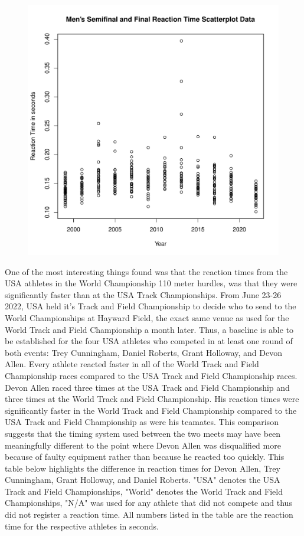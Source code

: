 \documentclass[12pt, letterpaper, titlepage]{article}
\begin{document}
\begin{figure}[h]
  \centering 
  \includegraphics[scale = 0.6]{DataScatterPlot}
  \label{fig:DataScatterPlot}
\end{figure}



One of the most interesting things found was that the reaction times from the USA
athletes in the World Championship 110 meter hurdles, was that they were significantly
faster than at the USA Track Championships.  From June 23-26 2022, USA held it's Track
and Field Championship to decide who to send to the World Championships at Hayward Field, the exact same venue as used for the World Track and Field Championship a month later.  Thus, a baseline is able to be established for the four USA athletes who competed in at least one round of both events: Trey Cunningham, Daniel Roberts, Grant Holloway, and Devon Allen. Every
athlete reacted faster in all of the World Track and Field Championship races compared
to the USA Track and Field Championship races. Devon Allen raced three times at
the USA Track and Field Championship and three times at the World Track and Field 
Championship.  His reaction times were significantly faster in the World Track and
Field Championship compared to the USA Track and Field Championship as were his
teamates.  This comparison suggests that the timing system used between the two
meets may have been meaningfully different to the point where Devon Allen was
disqualified more because of faulty equipment rather than because he reacted
too quickly.  This table below highlights the difference in reaction times for
Devon Allen, Trey Cunningham, Grant Holloway, and Daniel Roberts. "USA" denotes
the USA Track and Field Championships, "World" denotes the World Track and Field
Championships, "N/A" was used for any athlete that did not compete and thus
did not register a reaction time.  All numbers listed in the table are the reaction
time for the respective athletes in seconds. 
\end{document}
